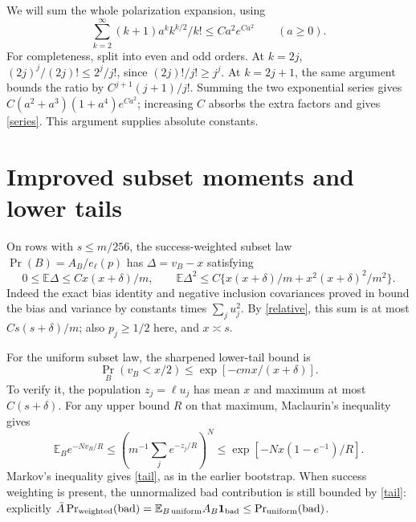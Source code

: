 \documentclass[11pt]{article}
\newcommand{\E}{\mathbb E}
\begin{document}
We will sum the whole polarization expansion, using
\begin{equation}\label{series}
 \sum_{k=2}^\infty (k+1)a^k k^{k/2}/k!
                 \le C a^2 e^{Ca^2}\qquad(a\ge0).
\end{equation}
For completeness, split into even and odd orders. At $k=2j$,
$(2j)^j/(2j)!\le2^j/j!$, since
$(2j)!/j!\ge j^j$. At $k=2j+1$, the same argument bounds the
ratio by $C^{j+1}(j+1)/j!$. Summing the two exponential series gives
$C(a^2+a^3)(1+a^4)e^{Ca^2}$; increasing $C$ absorbs the extra factors
and gives \eqref{series}. This argument supplies absolute constants.

\section*{Improved subset moments and lower tails}
On rows with $s\le m/256$, the success-weighted subset law
$\Pr(B)=A_B/e_\ell(p)$ has $\Delta=v_B-x$ satisfying
\begin{equation}\label{moments}
 0\le\E\Delta\le Cx(x+\delta)/m,\qquad
 \E\Delta^2\le C\{x(x+\delta)/m+x^2(x+\delta)^2/m^2\}.
\end{equation}
Indeed the exact bias identity and negative inclusion covariances
proved in 
bound the bias and variance by constants times
$\sum_j u_j^2$. By \eqref{relative}, this sum is at most
$Cs(s+\delta)/m$; also $p_j\ge1/2$ here, and $x\asymp s$.

For the uniform subset law, the sharpened lower-tail bound is
\begin{equation}\label{tail}
 \Pr_B(v_B<x/2)\le\exp[-cmx/(x+\delta)].
\end{equation}
To verify it, the population $z_j=\ell u_j$ has mean $x$ and maximum
at most $C(s+\delta)$. For any upper bound $R$ on that maximum,
Maclaurin's inequality gives
\[
 \E_Be^{-Nv_B/R}\le
 \left(m^{-1}\sum_j e^{-z_j/R}\right)^N
 \le\exp[-Nx(1-e^{-1})/R].
\]
Markov's inequality gives \eqref{tail}, as in the earlier bootstrap.
When success weighting is present, the unnormalized bad contribution
is still bounded by \eqref{tail}: explicitly
$\bar A\Pr_{\rm weighted}(\mathrm{bad})
=\E_{B\,\rm uniform}A_B\boldsymbol1_{\rm bad}
\le\Pr_{\rm uniform}(\mathrm{bad})$.
\end{document}
